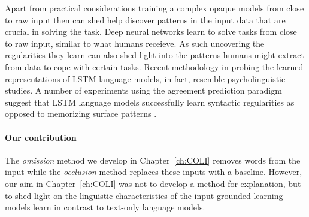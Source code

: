 Apart from practical considerations training a complex opaque models
from close to raw input then can shed help discover patterns in the
input data that are crucial in solving the task.
Deep neural networks learn to solve tasks from close to raw input, similar to
what humans receieve. As such
uncovering the regularities they learn can also shed light into the patterns
humans might extract from data to cope with certain tasks.
Recent methodology in probing the learned representations of LSTM language models,
in fact, resemble psycholinguistic studies.
A number of experiments using the agreement prediction paradigm
\cite{bock1991broken} suggest that LSTM language models successfully learn
syntactic regularities as opposed to memorizing surface patterns
\cite{linzen2016assessing,enguehard2017exploring,bernardy2017using,gulordava2018colorless}.

\paragraph{Our contribution}
The \emph{omission} method we develop in Chapter~\ref{ch:COLI} removes words
from the input while the \emph{occlusion} \cite{li2016understanding}
method replaces these inputs with a baseline.
However, our aim in Chapter~\ref{ch:COLI} was not to develop a method for explanation, but to
shed light on the linguistic characteristics of the input grounded learning
models learn in contrast to text-only language models.





